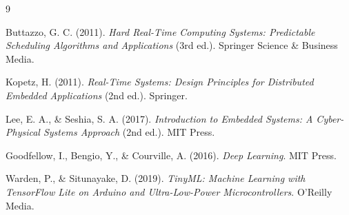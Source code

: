 \documentclass[11pt,a4paper]{article}
\begin{document}
\begin{thebibliography}{9}


Buttazzo, G. C. (2011).
\textit{Hard Real-Time Computing Systems: Predictable Scheduling Algorithms and Applications} (3rd ed.).
Springer Science \& Business Media.

Kopetz, H. (2011).
\textit{Real-Time Systems: Design Principles for Distributed Embedded Applications} (2nd ed.).
Springer.

Lee, E. A., \& Seshia, S. A. (2017).
\textit{Introduction to Embedded Systems: A Cyber-Physical Systems Approach} (2nd ed.).
MIT Press.

Goodfellow, I., Bengio, Y., \& Courville, A. (2016).
\textit{Deep Learning}.
MIT Press.

Warden, P., \& Situnayake, D. (2019).
\textit{TinyML: Machine Learning with TensorFlow Lite on Arduino and Ultra-Low-Power Microcontrollers}.
O'Reilly Media.



\end{thebibliography}
\end{document}
